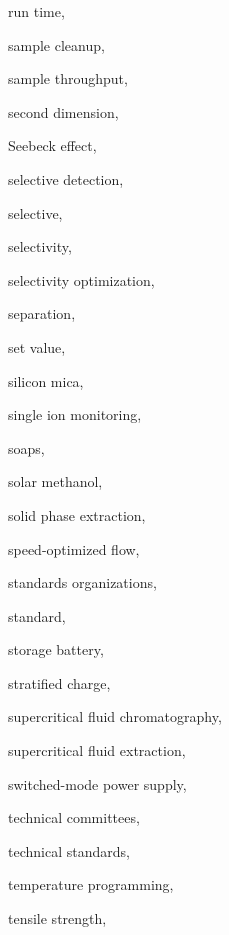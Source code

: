\begin{theindex}
  \item \lowercase {run time}, 
  \item \lowercase {sample cleanup}, 
  \item \lowercase {sample throughput}, 
  \item \lowercase {second dimension}, 
  \item {Seebeck effect}, 
  \item \lowercase {selective detection}, 
  \item \lowercase {selective}, 
  \item \lowercase {selectivity}, 
  \item \lowercase {selectivity optimization}, 
  \item \lowercase {separation}, 
  \item \lowercase {set value}, 
  \item \lowercase {silicon mica}, 
  \item \lowercase {single ion monitoring}, 
  \item \lowercase {soaps}, 
  \item \lowercase {solar methanol}, 
  \item \lowercase {solid phase extraction}, 
  \item \lowercase {speed-optimized flow}, 
  \item \lowercase {standards organizations}, 
  \item \lowercase {standard}, 
  \item \lowercase {storage battery}, 
  \item \lowercase {stratified charge}, 
  \item \lowercase {supercritical fluid chromatography}, 
  \item \lowercase {supercritical fluid extraction}, 
  \item \lowercase {switched-mode power supply}, 
  \item \lowercase {technical committees}, 
  \item \lowercase {technical standards}, 
  \item \lowercase {temperature programming}, 
  \item \lowercase {tensile strength}, 

\end{theindex}
